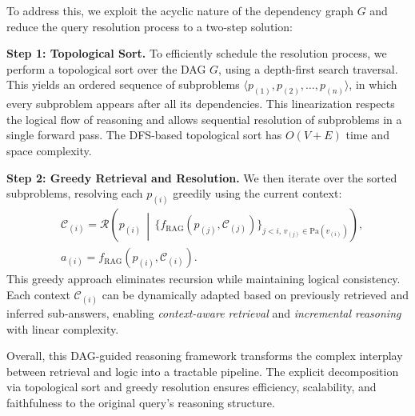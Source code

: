 \documentclass[letterpaper]{article} %
\begin{document}
To address this, we exploit the acyclic nature of the dependency graph $ G $ and reduce the query resolution process to a two-step solution:




\textbf{Step 1: Topological Sort.} 
To efficiently schedule the resolution process, we perform a topological sort over the DAG $ G $, using a depth-first search traversal. This yields an ordered sequence of subproblems $ \langle p_{(1)}, p_{(2)}, \dots, p_{(n)} \rangle $, in which every subproblem appears after all its dependencies. This linearization respects the logical flow of reasoning and allows sequential resolution of subproblems in a single forward pass. The DFS-based topological sort has $O(V + E)$ time and space complexity.



\textbf{Step 2: Greedy Retrieval and Resolution.} We then iterate over the sorted subproblems, resolving each $ p_{(i)} $ greedily using the current context:
\begin{align}
        &\mathcal{C}_{(i)} = \mathcal{R}\left(p_{(i)} \,\middle|\, \{f_{\mathrm{RAG}}(p_{(j)}, \mathcal{C}_{(j)})\}_{j < i,\, v_{(j)} \in \mathrm{Pa}(v_{(i)})} \right),\\
&a_{(i)} = f_{\mathrm{RAG}}(p_{(i)}, \mathcal{C}_{(i)}).
\end{align}
This greedy approach eliminates recursion while maintaining logical consistency. Each context $ \mathcal{C}_{(i)} $ can be dynamically adapted based on previously retrieved and inferred sub-answers, enabling \textit{context-aware retrieval} and \textit{incremental reasoning} with linear complexity.

Overall, this DAG-guided reasoning framework transforms the complex interplay between retrieval and logic into a tractable pipeline. The explicit decomposition via topological sort and greedy resolution ensures efficiency, scalability, and faithfulness to the original query's reasoning structure.







\end{document}
